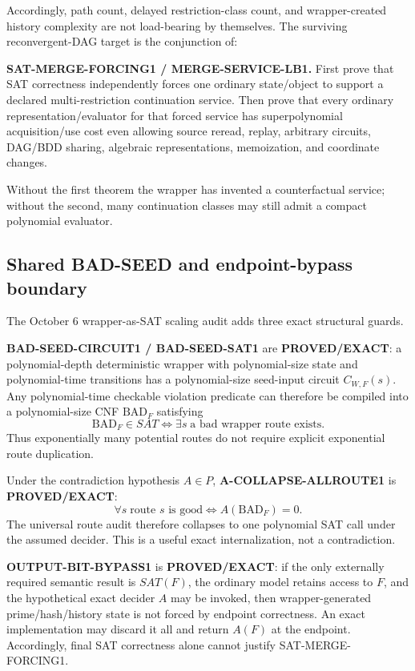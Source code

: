 \documentclass[11pt]{article}
\newcommand{\statusproved}{\textcolor{proved}{\textbf{PROVED/EXACT}}}
\theoremstyle{plain}
\theoremstyle{definition}
\theoremstyle{remark}
\begin{document}
Accordingly, path count, delayed restriction-class count, and wrapper-created
history complexity are not load-bearing by themselves.  The surviving
reconvergent-DAG target is the conjunction of:

\begin{candidatebox}
\textbf{SAT-MERGE-FORCING1 / MERGE-SERVICE-LB1.}
First prove that SAT correctness independently forces one ordinary
state/object to support a declared multi-restriction continuation service.
Then prove that every ordinary representation/evaluator for that forced
service has superpolynomial acquisition/use cost even allowing source reread,
replay, arbitrary circuits, DAG/BDD sharing, algebraic representations,
memoization, and coordinate changes.
\end{candidatebox}

Without the first theorem the wrapper has invented a counterfactual service;
without the second, many continuation classes may still admit a compact
polynomial evaluator.


\subsection{Shared BAD-SEED and endpoint-bypass boundary}

The October 6 wrapper-as-SAT scaling audit adds three exact structural guards.

\textbf{BAD-SEED-CIRCUIT1 / BAD-SEED-SAT1} are \statusproved: a
polynomial-depth deterministic wrapper with polynomial-size state and
polynomial-time transitions has a polynomial-size seed-input circuit
\(C_{W,F}(s)\).  Any polynomial-time checkable violation predicate can therefore
be compiled into a polynomial-size CNF \(\mathrm{BAD}_F\) satisfying
\[
\mathrm{BAD}_F\in SAT
\iff
\exists s\;\text{a bad wrapper route exists}.
\]
Thus exponentially many potential routes do not require explicit exponential
route duplication.

Under the contradiction hypothesis \(A\in P\),
\textbf{A-COLLAPSE-ALLROUTE1} is \statusproved:
\[
\forall s\;\text{route }s\text{ is good}
\iff
A(\mathrm{BAD}_F)=0.
\]
The universal route audit therefore collapses to one polynomial SAT call under
the assumed decider.  This is a useful exact internalization, not a
contradiction.

\textbf{OUTPUT-BIT-BYPASS1} is \statusproved: if the only externally required
semantic result is \(SAT(F)\), the ordinary model retains access to \(F\), and
the hypothetical exact decider \(A\) may be invoked, then wrapper-generated
prime/hash/history state is not forced by endpoint correctness.  An exact
implementation may discard it all and return \(A(F)\) at the endpoint.
Accordingly, final SAT correctness alone cannot justify SAT-MERGE-FORCING1.
\end{document}
